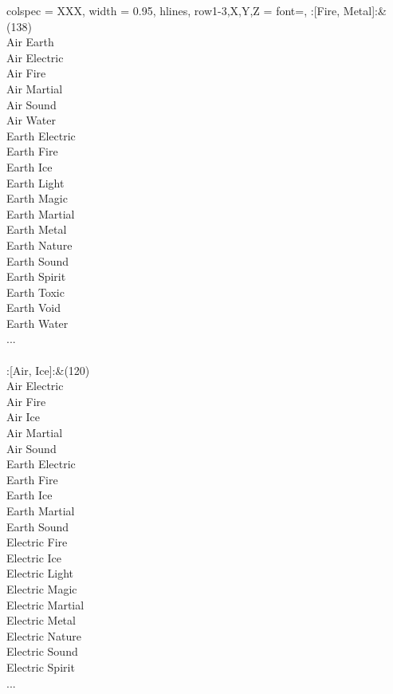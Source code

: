 \begin{longtblr}[
	caption = {2v2 Defending Weak},
	label = {2v2-Defending-Weak},
]{
	colspec = {XXX}, width = 0.95\linewidth,
	hlines,
	row{1-3,X,Y,Z} = {font=\bfseries},
}
	:[Fire, Metal]:&{(138)\\
	Air Earth \\
	Air Electric \\
	Air Fire \\
	Air Martial \\
	Air Sound \\
	Air Water \\
	Earth Electric \\
	Earth Fire \\
	Earth Ice \\
	Earth Light \\
	Earth Magic \\
	Earth Martial \\
	Earth Metal \\
	Earth Nature \\
	Earth Sound \\
	Earth Spirit \\
	Earth Toxic \\
	Earth Void \\
	Earth Water \\
	...\\
	}\\

	:[Air, Ice]:&{(120)\\
	Air Electric \\
	Air Fire \\
	Air Ice \\
	Air Martial \\
	Air Sound \\
	Earth Electric \\
	Earth Fire \\
	Earth Ice \\
	Earth Martial \\
	Earth Sound \\
	Electric Fire \\
	Electric Ice \\
	Electric Light \\
	Electric Magic \\
	Electric Martial \\
	Electric Metal \\
	Electric Nature \\
	Electric Sound \\
	Electric Spirit \\
	...\\
	}\\


\end{longtblr}
